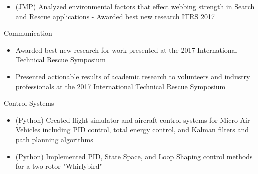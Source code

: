 \documentclass[]{friggeri-cv}
\begin{document}
\begin{entrylist}
{\begin{itemize}
    \item (JMP) Analyzed environmental factors that effect webbing strength in Search and Rescue applications -  Awarded best new research ITRS 2017

    \end{itemize}\vspace{1mm}}

    \entry
    {}
    {Communication}
    {}
    {\vspace{-4mm}
    \begin{itemize}
    \item Awarded best new research for work presented at the 2017 International Technical Rescue Symposium
    \item Presented actionable results of academic research to volunteers and industry professionals at the 2017 International Technical Rescue Symposium
    \end{itemize}\vspace{1mm}}


    \entry
    {}
    {Control Systems}
    {}
    {\vspace{-4mm}
    \begin{itemize}
        \item (Python) Created flight simulator and aircraft control systems for Micro Air Vehicles including PID control, total energy control, and Kalman filters and path planning algorithms
        \item (Python) Implemented PID, State Space, and Loop Shaping control methods for a two rotor "Whirlybird"
    \end{itemize}
    \vspace{1mm}}













\end{entrylist}
\end{document}
